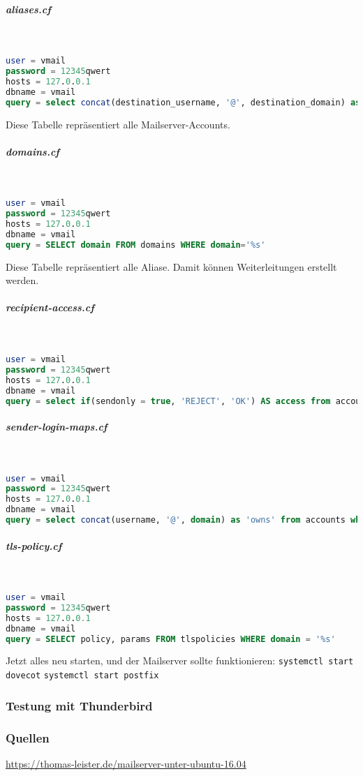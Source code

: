 \subparagraph{aliases.cf}\mbox{}\\
\begin{lstlisting}[language=SQL, caption=postfix - aliases.cf]
user = vmail
password = 12345qwert
hosts = 127.0.0.1
dbname = vmail
query = select concat(destination_username, '@', destination_domain) as destinations from aliases where source_username = '%u' and source_domain = '%d' and enabled = true;
\end{lstlisting}
Diese Tabelle repräsentiert alle Mailserver-Accounts.

\subparagraph{domains.cf}\mbox{}\\
\begin{lstlisting}[language=SQL, caption=postfix - domains.cf]
user = vmail
password = 12345qwert
hosts = 127.0.0.1
dbname = vmail
query = SELECT domain FROM domains WHERE domain='%s'
\end{lstlisting}
Diese Tabelle repräsentiert alle Aliase. Damit können Weiterleitungen erstellt werden.

\subparagraph{recipient-access.cf}\mbox{}\\
\begin{lstlisting}[language=SQL, caption=postfix - recipient-access.cf]
user = vmail
password = 12345qwert
hosts = 127.0.0.1
dbname = vmail
query = select if(sendonly = true, 'REJECT', 'OK') AS access from accounts where username = '%u' and domain = '%d' and enabled = true LIMIT 1;
\end{lstlisting}

\subparagraph{sender-login-maps.cf}\mbox{}\\
\begin{lstlisting}[language=SQL, caption=postfix - sender-login-maps.cf]
user = vmail
password = 12345qwert
hosts = 127.0.0.1
dbname = vmail
query = select concat(username, '@', domain) as 'owns' from accounts where username = '%u' AND domain = '%d' and enabled = true union select concat(destination_username, '@', destination_domain) AS 'owns' from aliases where source_username = '%u' and source_domain = '%d' and enabled = true;
\end{lstlisting}

\subparagraph{tls-policy.cf}\mbox{}\\
\begin{lstlisting}[language=SQL, caption=postfix - tls-policy.cf]
user = vmail
password = 12345qwert
hosts = 127.0.0.1
dbname = vmail
query = SELECT policy, params FROM tlspolicies WHERE domain = '%s'
\end{lstlisting}

Jetzt alles neu starten, und der Mailserver sollte funktionieren:\newline
\verb|systemctl start dovecot|\newline
\verb|systemctl start postfix|\newline



\subsubsection{Testung mit Thunderbird}


\subsubsection{Quellen}
\url{https://thomas-leister.de/mailserver-unter-ubuntu-16.04}


